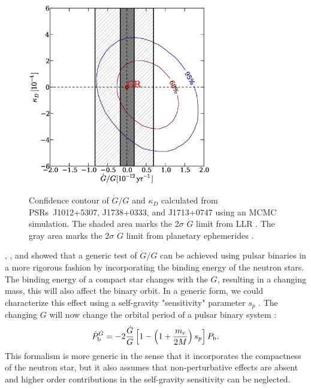 \begin{figure}
\includegraphics[width=8cm]{finalGdot.ps} \\ 
\caption {\label{fig:Gdot} Confidence contour of $\dot{G}/G$ and $\kappa_D$
calculated from PSRs~J1012+5307, J1738+0333, and J1713+0747 using an MCMC simulation.
The shaded area marks the 2$\sigma$ $\dot{G}$ limit from LLR \citep{hmb10}. The gray area
marks the 2$\sigma$ $\dot{G}$ limit from planetary ephemerides \citep{fle+14}.
} 
\end{figure} 

\citet{nor90}, \citet{lwj+09}, and \citet{fwe+12} showed that a generic test
of $\dot{G}/G$ can be achieved using pulsar
binaries in a more rigorous fashion by incorporating the binding energy of the neutron stars.
The binding energy of a compact star changes with the $G$, resulting in a changing mass, this will also affect the binary orbit.
In a generic form, we could characterize this effect using a self-gravity "sensitivity" parameter $s_p$ \citep{Will93}.
The changing $G$ will now change the orbital period of a pulsar binary system \citep{nor90, lwj+09}:
\begin{equation}
\dot{P}_{\rm b}^{\dot{G}} = -2 \frac{\dot{G}}{G}
\left[1-\left( 1+\frac{m_c}{2M}\right) s_p\right]P_{\rm b}.
\end{equation}
This formalism is more generic in the sense that it incorporates the compactness of the neutron star, 
but it also assumes that non-perturbative effects are absent 
and higher order contributions in the self-gravity sensitivity can be neglected.

